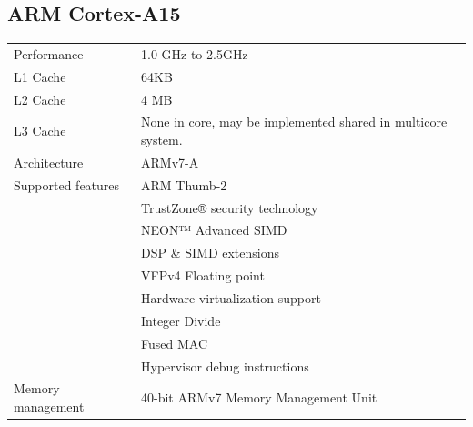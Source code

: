\subsection{ARM Cortex-A15}
\begin{table}[H]
  \begin{tabular}{ll}
    Performance       & 1.0 GHz to 2.5GHz  \\
    L1 Cache          & 64KB \\
    L2 Cache          & 4 MB \\
    L3 Cache          & None in core, may be implemented shared in multicore system. \\
    Architecture      & ARMv7-A            \\
    Supported features& ARM Thumb-2 \\
                      & TrustZone® security technology \\
                      & NEON™ Advanced SIMD \\
                      & DSP \& SIMD extensions \\
                      & VFPv4 Floating point \\
                      & Hardware virtualization support \\
                      & Integer Divide \\
                      & Fused MAC \\
                      & Hypervisor debug instructions \\
    Memory management & 40-bit ARMv7 Memory Management Unit
  \end{tabular}
\end{table}
